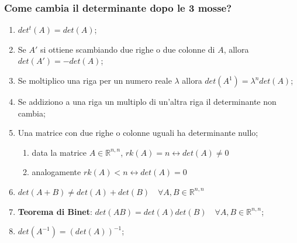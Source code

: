 \documentclass[x11names]{article}
\begin{document}
\subsubsection{Come cambia il determinante dopo le 3 mosse?}
\begin{enumerate}
    \item $det^t(A) = det(A)$;
    \item Se $A'$ si ottiene scambiando due righe o due colonne di $A$, allora $det(A') = -det(A)$;
    \item Se moltiplico una riga per un numero reale $\lambda$ allora $det(A^1) = \lambda^n det(A)$;
    \item Se addiziono a una riga un multiplo di un'altra riga il determinante non cambia;
    \item Una matrice con due righe o colonne uguali ha determinante nullo;
    \begin{enumerate}
        \item data la matrice $A \in \mathbb{R}^{n,n}$, $rk(A) = n \longleftrightarrow det(A) \neq 0$
        \item analogamente $rk(A) < n \longleftrightarrow det(A) = 0$
    \end{enumerate}
            
    \item $det(A+B) \neq det(A) + det(B)\quad \forall A,B \in \mathbb{R}^{n,n}$
\item \colorbox{myred}{\begin{minipage}{3.5in}\textbf{Teorema di Binet}: $det(AB) = det(A) det(B) \quad \forall A,B \in \mathbb{R}^{n,n}$;\end{minipage}}
    \item $det(A^{-1}) = (det(A))^{-1}$;
\end{enumerate}
\end{document}
